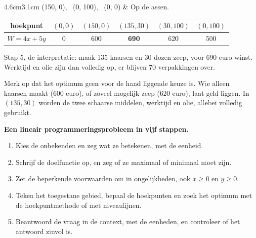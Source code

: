 {{\begin{stappenvrij}{4.6cm}{3.1cm}
(150, 0), \ (0, 100), \ (0, 0) & Op de assen.
\end{stappenvrij}}{}
{\small\renewcommand{\arraystretch}{1.4}\setlength{\tabcolsep}{4pt}\begin{tabular}{|c|c|c|c|c|c|}
\hline
\textbf{hoekpunt} & $(0, 0)$ & $(150, 0)$ & $(135, 30)$ & $(30, 100)$ & $(0, 100)$ \\ \hline
$W = 4x + 5y$ & 0 & 600 & \textbf{690} & 620 & 500 \\ \hline
\end{tabular}}

\smallskip
Stap 5, de interpretatie: maak 135 kaarsen en 30 dozen zeep, voor 690 euro winst. Werktijd en olie zijn dan volledig op, er blijven 70 verpakkingen over.}

Merk op dat het optimum geen voor de hand liggende keuze is. Wie alleen kaarsen maakt (600 euro), of zoveel mogelijk zeep (620 euro), laat geld liggen. In $(135, 30)$ worden de twee schaarse middelen, werktijd en olie, allebei volledig gebruikt.

\begin{werkwijze}
\textbf{Een lineair programmeringsprobleem in vijf stappen.}
\begin{enumerate}
\item Kies de onbekenden en zeg wat ze betekenen, met de eenheid.
\item Schrijf de doelfunctie op, en zeg of ze maximaal of minimaal moet zijn.
\item Zet de beperkende voorwaarden om in ongelijkheden, ook $x \geqslant 0$ en $y \geqslant 0$.
\item Teken het toegestane gebied, bepaal de hoekpunten en zoek het optimum met de hoekpuntmethode of met niveaulijnen.
\item Beantwoord de vraag in de context, met de eenheden, en controleer of het antwoord zinvol is.
\end{enumerate}
\end{werkwijze}

